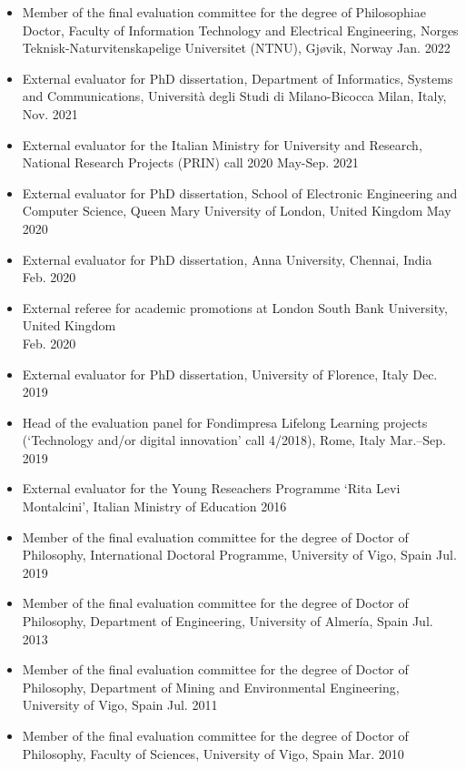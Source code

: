 \documentclass[11pt]{article}
\begin{document}
\begin{itemize}
    \item Member of the final evaluation committee for the degree of Philosophiae Doctor, Faculty of Information Technology and Electrical Engineering, Norges Teknisk-Naturvitenskapelige Universitet (NTNU), Gjøvik, Norway \hfill Jan. 2022
    \item External evaluator for PhD dissertation, Department of Informatics, Systems and Communications, Università degli Studi di Milano-Bicocca Milan, Italy, \hfill Nov. 2021
    \item External evaluator for the Italian Ministry for University and Research, National Research Projects (PRIN) call 2020 \hfill May-Sep. 2021
    \item External evaluator for PhD dissertation, School of Electronic Engineering and Computer Science, Queen Mary University of London, United Kingdom \hfill May 2020
    \item External evaluator for PhD dissertation, Anna University, Chennai, India \hfill Feb. 2020
    \item External referee for academic promotions at London South Bank University, United Kingdom \\ \mbox{} \hfill Feb. 2020
    \item External evaluator for PhD dissertation, University of Florence, Italy \hfill Dec. 2019
    \item Head of the evaluation panel for Fondimpresa Lifelong Learning projects (`Technology and/or digital innovation' call 4/2018), Rome, Italy \hfill Mar.--Sep. 2019
    \item External evaluator for the Young Reseachers Programme ‘Rita Levi Montalcini’, Italian Ministry of Education \hfill 2016
    \item Member of the final evaluation committee for the degree of Doctor of Philosophy, International Doctoral Programme, University of Vigo, Spain \hfill Jul. 2019
    \item Member of the final evaluation committee for the degree of Doctor of Philosophy, Department of Engineering, University of Almería, Spain \hfill Jul. 2013
    \item Member of the final evaluation committee for the degree of Doctor of Philosophy, Department of Mining and Environmental Engineering, University of Vigo, Spain \hfill Jul. 2011
    \item Member of the final evaluation committee for the degree of Doctor of Philosophy, Faculty of Sciences, University of Vigo, Spain \hfill Mar. 2010 
\end{itemize}
\end{document}
